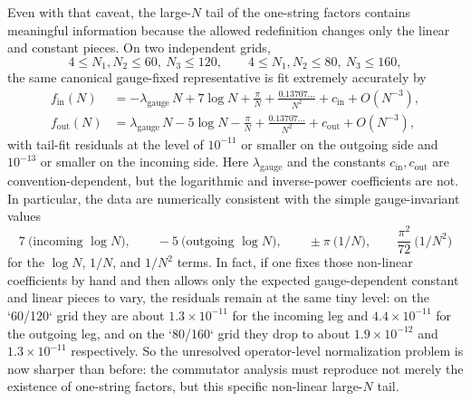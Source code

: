 \documentclass[11pt]{article}
\numberwithin{equation}{section}
\begin{document}
Even with that caveat, the large-$N$ tail of the one-string factors contains meaningful information because the allowed redefinition changes only the linear and constant pieces. On two independent grids,
\begin{equation}
\label{eq:s12-1-032}
4\le N_1,N_2\le 60,\ N_3\le 120,
\qquad
4\le N_1,N_2\le 80,\ N_3\le 160,
\end{equation}
the same canonical gauge-fixed representative is fit extremely accurately by
\begin{equation}
\label{eq:s12-1-033}
\begin{aligned}
f_{\mathrm{in}}(N)
&=
-\lambda_{\mathrm{gauge}}\,N
+7\log N
+\frac{\pi}{N}
+\frac{0.13707\ldots}{N^2}
+c_{\mathrm{in}}
+O(N^{-3}),\\[3pt]
f_{\mathrm{out}}(N)
&=
\lambda_{\mathrm{gauge}}\,N
-5\log N
-\frac{\pi}{N}
+\frac{0.13707\ldots}{N^2}
+c_{\mathrm{out}}
+O(N^{-3}),
\end{aligned}
\end{equation}
with tail-fit residuals at the level of $10^{-11}$ or smaller on the outgoing side and $10^{-13}$ or smaller on the incoming side. Here $\lambda_{\mathrm{gauge}}$ and the constants $c_{\mathrm{in}},c_{\mathrm{out}}$ are convention-dependent, but the logarithmic and inverse-power coefficients are not. In particular, the data are numerically consistent with the simple gauge-invariant values
\begin{equation}
\label{eq:s12-1-034}
7\ \text{(incoming $\log N$)},\qquad
-5\ \text{(outgoing $\log N$)},\qquad
\pm\pi\ \text{($1/N$)},\qquad
\frac{\pi^2}{72}\ \text{($1/N^2$)}
\end{equation}
for the $\log N$, $1/N$, and $1/N^2$ terms. In fact, if one fixes those non-linear coefficients by hand and then allows only the expected gauge-dependent constant and linear pieces to vary, the residuals remain at the same tiny level: on the `60/120` grid they are about $1.3\times 10^{-11}$ for the incoming leg and $4.4\times 10^{-11}$ for the outgoing leg, and on the `80/160` grid they drop to about $1.9\times 10^{-12}$ and $1.3\times 10^{-11}$ respectively. So the unresolved operator-level normalization problem is now sharper than before: the commutator analysis must reproduce not merely the existence of one-string factors, but this specific non-linear large-$N$ tail.
\end{document}
